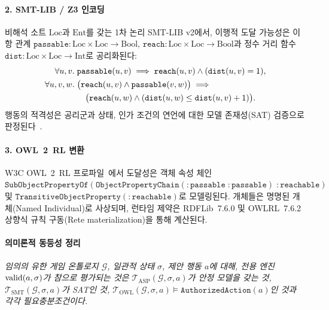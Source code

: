 \paragraph{2. SMT-LIB / Z3 인코딩}
비해석 소트 $\text{Loc}$과 $\text{Ent}$를 갖는 1차 논리 SMT-LIB v2에서, 이행적 도달 가능성은 이항 관계 $\texttt{passable}: \text{Loc} \times \text{Loc} \to \text{Bool}$, $\texttt{reach}: \text{Loc} \times \text{Loc} \to \text{Bool}$과 정수 거리 함수 $\texttt{dist}: \text{Loc} \times \text{Loc} \to \text{Int}$로 공리화된다:
\begin{align}
\forall u, v.\; &\texttt{passable}(u, v) \implies \texttt{reach}(u, v) \land (\texttt{dist}(u, v) = 1), \label{eq:smt-base} \\
\forall u, v, w.\; &\bigl(\texttt{reach}(u, v) \land \texttt{passable}(v, w)\bigr) \implies \notag \\
&\quad \bigl(\texttt{reach}(u, w) \land (\texttt{dist}(u, w) \le \texttt{dist}(u, v) + 1)\bigr). \label{eq:smt-trans}
\end{align}
행동의 적격성은 공리군과 상태, 인가 조건의 연언에 대한 모델 존재성(SAT) 검증으로 판정된다~\cite{demoura2008z3}.

\paragraph{3. OWL~2~RL 변환}
W3C OWL~2~RL 프로파일~\cite{motik2012owl2profiles}에서 도달성은 객체 속성 체인 $\texttt{SubObjectPropertyOf}(\texttt{ObjectPropertyChain}(:\texttt{passable} \; :\texttt{passable}) \; :\texttt{reachable})$ 및 $\texttt{TransitiveObjectProperty}(:\texttt{reachable})$로 모델링된다. 개체들은 명명된 개체(Named Individual)로 사상되며, 런타임 제약은 RDFLib~7.6.0 및 OWLRL~7.6.2 상향식 규칙 구동(Rete materialization)을 통해 계산된다.

\paragraph{의미론적 동등성 정리}
\textit{임의의 유한 게임 온톨로지 $\mathcal{G}$, 일관적 상태 $\sigma$, 제안 행동 $a$에 대해, 전용 엔진 $\mathrm{valid}(a, \sigma)$가 참으로 평가되는 것은 $\mathcal{T}_{\mathrm{ASP}}(\mathcal{G}, \sigma, a)$가 안정 모델을 갖는 것, $\mathcal{T}_{\mathrm{SMT}}(\mathcal{G}, \sigma, a)$가 SAT인 것, $\mathcal{T}_{\mathrm{OWL}}(\mathcal{G}, \sigma, a) \models \texttt{AuthorizedAction}(a)$인 것과 각각 필요충분조건이다.}


